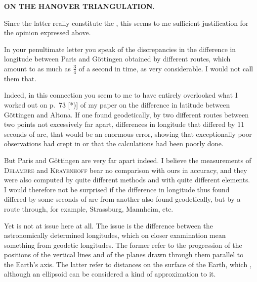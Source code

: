 \par\clearpage
\noindent\null\hfill{\small\textbf{ON THE HANOVER TRIANGULATION.}}\hfill{}\par\medskip
\par\noindent\hspace*{\parindent}Since the latter really constitute the , this seems to me sufficient justification for the opinion expressed above.
\par\noindent\hspace*{\parindent}In your penultimate letter you speak of the discrepancies in the difference in longitude between Paris and Göttingen obtained by different routes, which amount to as much as \(\frac{3}{4}\) of a second in time, as very considerable. I would not call them that.
\par\noindent\hspace*{\parindent}Indeed, in this connection you seem to me to have entirely overlooked what I worked out on p.~73 [*)] of my paper on the difference in latitude between Göttingen and Altona. If one found geodetically, by two different routes between two points not excessively far apart, differences in longitude that differed by 11 seconds of arc, that would be an enormous error, showing that exceptionally poor observations had crept in or that the calculations had been poorly done.
\par\noindent\hspace*{\parindent}But Paris and Göttingen are very far apart indeed. I believe the measurements of \textsc{Delambre} and \textsc{Krayenhoff} bear no comparison with ours in accuracy, and they were also computed by quite different methods and with quite different elements. I would therefore not be surprised if the difference in longitude thus found differed by some seconds of arc from another also found geodetically, but by a route through, for example, Strassburg, Mannheim, etc.
\par\noindent\hspace*{\parindent}Yet  is not at issue here at all. The issue is the difference between the astronomically determined longitudes, which on closer examination mean something  from geodetic longitudes. The former refer to the progression of the positions of the vertical lines and of the planes drawn through them parallel to the Earth's axis. The latter refer to distances on the surface of the Earth, which , although an ellipsoid can be considered a kind of approximation to it.
